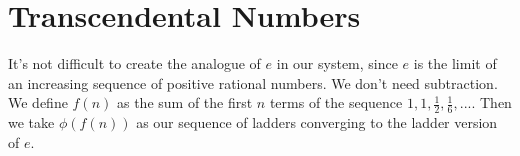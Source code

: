 \documentclass{article}
\begin{document}
\section{Transcendental Numbers}

It's not difficult to create the analogue of $e$ in our system, since $e$ is the limit of an increasing sequence of positive rational numbers. We don't need subtraction. We define $f(n)$ as the sum of the first $n$ terms of the sequence $1,1,\frac{1}{2}, \frac{1}{6}, ...$. Then we take $\phi(f(n))$ as our sequence of ladders converging to the ladder version of $e$.



\end{document}
